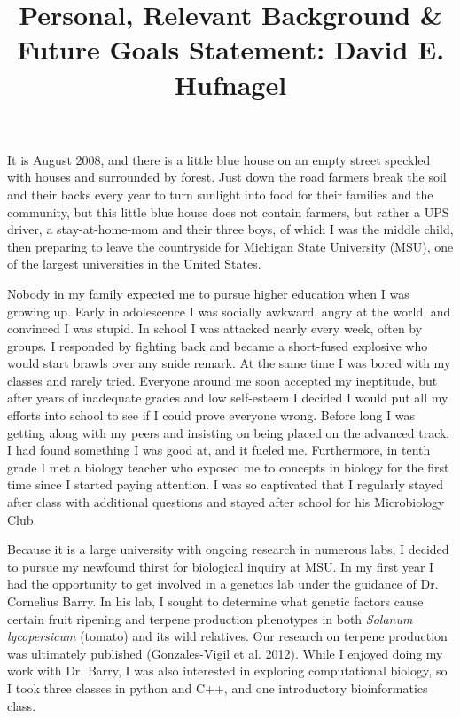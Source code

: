 \documentclass[12pt]{amsart}
\title{Personal, Relevant Background \& Future Goals Statement: David E. Hufnagel}
\begin{document}
\maketitle
It is August 2008, and there is a little blue house on an empty street speckled with houses and surrounded by forest. 
Just down the road farmers break the soil and their backs every year to turn sunlight into food for their families and the community, but this little blue house does not contain farmers, but rather a UPS driver, a stay-at-home-mom and their three boys, of which I was the middle child, then preparing to leave the countryside for Michigan State University (MSU), one of the largest universities in the United States.

Nobody in my family expected me to pursue higher education when I was growing up.  
Early in adolescence I was socially awkward, angry at the world, and convinced I was stupid.  
In school I was attacked nearly every week, often by groups.  
I responded by fighting back and became a short-fused explosive who would start brawls over any snide remark.
At the same time I was bored with my classes and rarely tried.  
Everyone around me soon accepted my ineptitude, but after years of inadequate grades and low self-esteem I decided I would put all my efforts into school to see if I could prove everyone wrong.  
Before long I was getting along with my peers and insisting on being placed on the advanced track.  
I had found something I was good at, and it fueled me.  
Furthermore, in tenth grade I met a biology teacher who exposed me to concepts in biology for the first time since I started paying attention.  
I was so captivated that I regularly stayed after class with additional questions and stayed after school for his Microbiology Club.  

Because it is a large university with ongoing research in numerous labs, I decided to pursue my newfound thirst for biological inquiry at MSU.
In my first year I had the opportunity to get involved in a genetics lab under the guidance of Dr. Cornelius Barry. 
In his lab, I sought to determine what genetic factors cause certain fruit ripening and terpene production phenotypes in both  \textit{Solanum lycopersicum} (tomato) and its wild relatives.  
Our research on terpene production was ultimately published (Gonzales-Vigil et al. 2012).  
While I enjoyed doing my work with Dr. Barry, I was also interested in exploring computational biology, so I took three classes in python and C++, and one introductory bioinformatics class.
\end{document}
